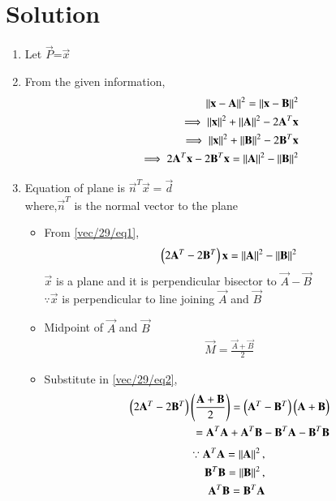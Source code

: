 \documentclass[journal,12pt,twocolumn]{IEEEtran}
\newcommand{\myvec}[1]{\ensuremath{\begin{pmatrix}#1\end{pmatrix}}}
\begin{document}
\section{Solution}
\begin{enumerate}
\item Let $\vec{P}$=$\vec{x}$\\
\item From the given information,
\begin{align}
\left\lVert\mathbf{x}-\mathbf{A}\right\rVert^2=\left\lVert\mathbf{x}-\mathbf{B}\right\rVert^2
\\
\implies\left\lVert\mathbf{x}\right\rVert^2+\left\lVert\mathbf{A}\right\rVert^2-2\mathbf{A}^T\mathbf{x}
\\
\implies \left\lVert\mathbf{x}\right\rVert^2+\left\lVert\mathbf{B}\right\rVert^2-2\mathbf{B}^T\mathbf{x}
\\
\implies 2\mathbf{A}^T\mathbf{x}-2\mathbf{B}^T\mathbf{x}=\left\lVert\mathbf{A}\right\rVert^2-\left\lVert\mathbf{B}\right\rVert^2  \label{vec/29/eq1}
\end{align}
\item Equation of plane is $\vec{n}^T\vec{x}=\vec{d}$
\\
where,$\vec{n}^T$ is the normal vector to the plane 
\begin{itemize}
\item From \eqref{vec/29/eq1},
\begin{align}
\myvec{2\vec{A}^T-2\vec{B}^T}\vec{x}=\norm{\vec{A}}^2-\norm{\vec{B}}^2 \label{vec/29/eq2}
\end{align}
$\vec{x}$ is a plane and it is perpendicular bisector to $\vec{A}-\vec{B}$
\\
$\because\vec{x}$ is perpendicular to line joining $\vec{A}$ and $\vec{B}$
\item Midpoint of $\vec{A}$ and $\vec{B}$
\begin{align}
\vec{M}= \frac{\vec{A}+\vec{B}}{2}
\end{align}
\item Substitute in \eqref{vec/29/eq2},
\begin{align}
\myvec{2\vec{A}^T-2\vec{B}^T}\brak{\frac{\vec{A}+\vec{B}}{2}}
=\myvec{\vec{A}^T-\vec{B}^T}\myvec{\vec{A}+\vec{B}}
\\
=\vec{A}^T\vec{A}+\vec{A}^T\vec{B}-\vec{B}^T\vec{A}-\vec{B}^T\vec{B}
\end{align}
\begin{align}
\because \mathbf{A}^T\mathbf{A}=\left\lVert\mathbf{A}\right\rVert^2,
\\
\mathbf{B}^T\mathbf{B}=\left\lVert\mathbf{B}\right\rVert^2,
\\
\mathbf{A}^T\mathbf{B}=\mathbf{B}^T\mathbf{A}
\end{align}
\begin{align}

\end{align}
\end{itemize}
\end{enumerate}
\end{document}

